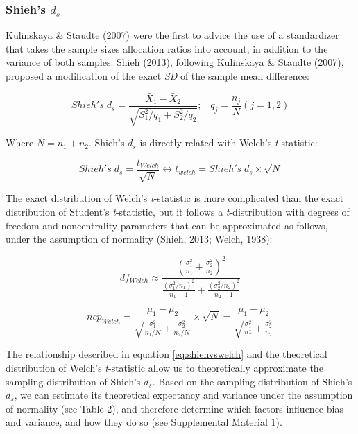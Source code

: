 \documentclass[
  man,floatsintext]{apa6}
\begin{document}
\hypertarget{shiehs-d_s}{%
\subsubsection{\texorpdfstring{Shieh's \(d_s\)}{Shieh's d\_s}}\label{shiehs-d_s}}

Kulinskaya \& Staudte (2007) were the first to advice the use of a standardizer that takes the sample sizes allocation ratios into account, in addition to the variance of both samples. Shieh (2013), following Kulinskaya \& Staudte (2007), proposed a modification of the exact \emph{SD} of the sample mean difference:

\begin{equation} 
Shieh's \; d_s = \frac{\bar{X}_1 - \bar{X}_2}{\sqrt{S_1^2/q_1+S_2^2/q_2}}; \;\;\; q_j=\frac{n_j}{N} (j=1,2)
\label{eq:Shiehds}
\end{equation}

Where \(N = n_1+n_2\). Shieh's \(d_{s}\) is directly related with Welch's \emph{t}-statistic:

\begin{equation} 
Shieh's \; d_s=\frac{t_{Welch}}{\sqrt{N}}\leftrightarrow t_{welch} = Shieh's \; d_s \times \sqrt{N}
\label{eq:shiehvswelch}
\end{equation}

The exact distribution of Welch's \emph{t}-statistic is more complicated than the exact distribution of Student's \emph{t}-statistic, but it follows a \emph{t}-distribution with degrees of freedom and noncentrality parameters that can be approximated as follows, under the assumption of normality (Shieh, 2013; Welch, 1938):

\begin{equation} 
df_{Welch} \approx \frac{\left(\frac{\sigma^2_1}{n_1}+\frac{\sigma^2_2}{n_2} \right)^2}{\frac{(\sigma^2_1/n_1)^2}{n_1-1}+\frac{(\sigma^2_2/n_2)^2}{n_2-1}}
\label{eq:welchdf}
\end{equation}

\begin{equation} 
ncp_{Welch} = \frac{\mu_1-\mu_2}{\sqrt{\frac{\sigma_1^2}{n_1/N}+\frac{\sigma_2^2}{n_2/N}}} \times \sqrt{N} = \frac{\mu_1-\mu_2}{\sqrt{\frac{\sigma_1^2}{n1}+\frac{\sigma_2^2}{n_2}}}
\label{eq:welchncp}
\end{equation}

The relationship described in equation \ref{eq:shiehvswelch} and the theoretical distribution of Welch's \emph{t}-statistic allow us to theoretically approximate the sampling distribution of Shieh's \(d_s\). Based on the sampling distribution of Shieh's \(d_s\), we can estimate its theoretical expectancy and variance under the assumption of normality (see Table 2), and therefore determine which factors influence bias and variance, and how they do so (see Supplemental Material 1).
\end{document}
